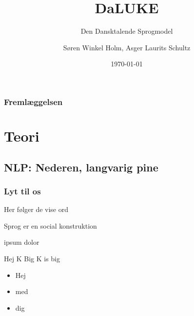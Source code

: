 \documentclass{beamer}
\title{DaLUKE}
\subtitle{
    Den Dansktalende Sprogmodel
}
\author[Søren Holm, Asger Schultz]{Søren Winkel Holm, Asger Laurits Schultz}
\institute[DTU]{Danmarks Tekniske Universitet}
\date{\today}
\begin{document}
\begin{frame}
    \titlepage
\end{frame}

\begin{frame}
    \frametitle{Fremlæggelsen}
    \tableofcontents
\end{frame}

\section{Teori}
\subsection{NLP: Nederen, langvarig pine}

\begin{frame}
    \frametitle{Lyt til os}
    Her følger de vise ord
    \begin{definition}
        Sprog er en social konstruktion
    \end{definition}
    \begin{example}
        ipsum dolor
    \end{example}
    \begin{block}{Hej K}
        Big K is big
    \end{block}
    \begin{itemize}
        \pause
        \item Hej
        \pause
        \item med
        \pause
        \item dig
    \end{itemize}
\end{frame}
\end{document}
